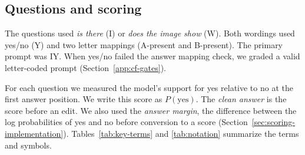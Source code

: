 \subsection{Questions and scoring}
\label{app:protocol}

The questions used \emph{is there} (I) or \emph{does the image show} (W). Both wordings used yes/no (Y) and two letter mappings (A-present and B-present). The primary prompt was IY. When yes/no failed the answer mapping check, we graded a valid letter-coded prompt (Section~\ref{app:cf-gates}).

For each question we measured the model's support for yes relative to no at the first answer position. We write this score as $P(\mathrm{yes})$. The \emph{clean answer} is the score before an edit. We also used the \emph{answer margin}, the difference between the log probabilities of yes and no before conversion to a score (Section~\ref{sec:scoring-implementation}). Tables~\ref{tab:key-terms} and \ref{tab:notation} summarize the terms and symbols.

\begin{table}[pos=b]
\centering
\caption{\textbf{Key terms.} Definitions for the RAW evaluation.}
\label{tab:key-terms}
\end{table}


